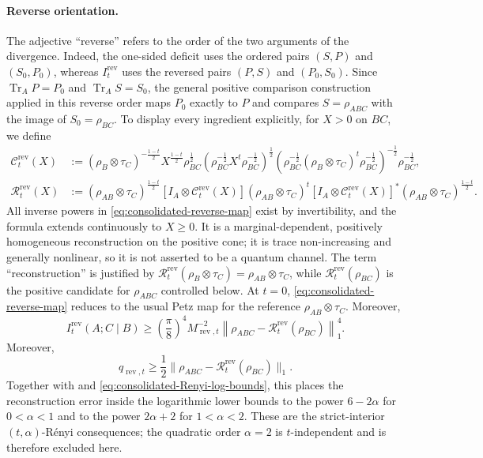 \documentclass[11pt]{article}
\theoremstyle{remark}
\DeclareMathOperator{\rev}{rev}
\newcommand{\1}{\mathbbm{1}}
\begin{document}
\paragraph{Reverse orientation.}
The adjective ``reverse'' refers to the order of the two arguments of
the divergence.  Indeed, the
one-sided deficit uses the ordered pairs $(S,P)$ and $(S_0,P_0)$,
whereas $I_t^{\rev}$ uses the reversed pairs $(P,S)$ and $(P_0,S_0)$.
Since $\operatorname{Tr}_A P=P_0$ and
$\operatorname{Tr}_A S=S_0$, the general positive comparison
construction applied in this reverse order maps $P_0$ exactly to $P$
and compares $S=\rho_{ABC}$ with the image of
 $S_0=\rho_{BC}$.  To display every ingredient explicitly, for
 $X>0$ on $BC$, we define
\begin{equation}
 \begin{aligned}
 \mathcal C_t^{\rev}(X)
 &:=(\rho_B\otimes\tau_C)^{-\frac{1-t}{2}}X^{\frac{1-t}{2}}
   \rho_{BC}^{\frac12}
   \left(\rho_{BC}^{-\frac12}X^t\rho_{BC}^{-\frac12}\right)^{\frac12}
   \left(
    \rho_{BC}^{-\frac12}(\rho_B\otimes\tau_C)^t
    \rho_{BC}^{-\frac12}
   \right)^{-\frac12}\rho_{BC}^{-\frac12},\\
 \mathcal R_t^{\rev}(X)
 &:=(\rho_{AB}\otimes\tau_C)^{\frac{1-t}{2}}
   \left[I_A\otimes\mathcal C_t^{\rev}(X)\right]
   (\rho_{AB}\otimes\tau_C)^t
   \left[I_A\otimes\mathcal C_t^{\rev}(X)\right]^*
   (\rho_{AB}\otimes\tau_C)^{\frac{1-t}{2}}.
 \end{aligned}
 \label{eq:consolidated-reverse-map}
\end{equation}
All inverse powers in \eqref{eq:consolidated-reverse-map} exist by
invertibility, and the formula extends continuously to $X\geq0$.
It is a marginal-dependent, positively homogeneous reconstruction on
the positive cone; it is trace non-increasing and generally
nonlinear, so it is not asserted to be a quantum channel.  The term
``reconstruction'' is justified by
$\mathcal R_t^{\rev}(\rho_B\otimes\tau_C)
=\rho_{AB}\otimes\tau_C$, while
$\mathcal R_t^{\rev}(\rho_{BC})$ is the positive candidate for
$\rho_{ABC}$ controlled below.  At $t=0$,
\eqref{eq:consolidated-reverse-map} reduces to the usual Petz map for
the reference $\rho_{AB}\otimes\tau_C$.  Moreover,
\begin{equation}
 \boxed{
 I_t^{\rev}(A;C\mid B)
 \geq\left(\frac\pi8\right)^4M_{\rev,t}^{-2}
 \left\lVert\rho_{ABC}
 -\mathcal R_t^{\rev}(\rho_{BC})\right\rVert_1^4.}
 \label{eq:consolidated-reverse-trace-bound}
\end{equation}
Moreover,
\begin{equation}
 q_{\rev,t}\geq\frac12
 \lVert\rho_{ABC}-\mathcal R_t^{\rev}(\rho_{BC})\rVert_1.
\end{equation}
Together with
 and
\eqref{eq:consolidated-Renyi-log-bounds}, this places the
reconstruction error inside the logarithmic lower bounds to the power
$6-2\alpha$ for $0<\alpha<1$ and to the power $2\alpha+2$ for
$1<\alpha<2$.  These are the strict-interior $(t,\alpha)$-R\'enyi
consequences; the quadratic order $\alpha=2$ is $t$-independent and is
therefore excluded here.
\end{document}
